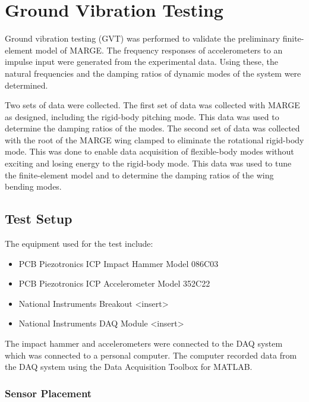 \chapter{Ground Vibration Testing}
\label{ch:gvt}

Ground vibration testing (GVT) was performed to validate the preliminary finite-element model of MARGE. The frequency responses of accelerometers to an impulse input were generated from the experimental data. Using these, the natural frequencies and the damping ratios of dynamic modes of the system were determined.

Two sets of data were collected. The first set of data was collected with MARGE as designed, including the rigid-body pitching mode. This data was used to determine the damping ratios of the modes. The second set of data was collected with the root of the MARGE wing clamped to eliminate the rotational rigid-body mode. This was done to enable data acquisition of flexible-body modes without exciting and losing energy to the rigid-body mode. This data was used to tune the finite-element model and to determine the damping ratios of the wing bending modes.

\section{Test Setup} %

The equipment used for the test include:
\begin{itemize}
    \item PCB Piezotronics ICP Impact Hammer Model 086C03
    \item PCB Piezotronics ICP Accelerometer Model 352C22
    \item National Instruments Breakout <insert>
    \item National Instruments DAQ Module <insert>
\end{itemize}

The impact hammer and accelerometers were connected to the DAQ system which was connected to a personal computer. The computer recorded data from the DAQ system using the Data Acquisition Toolbox for MATLAB.

\subsection{Sensor Placement}

